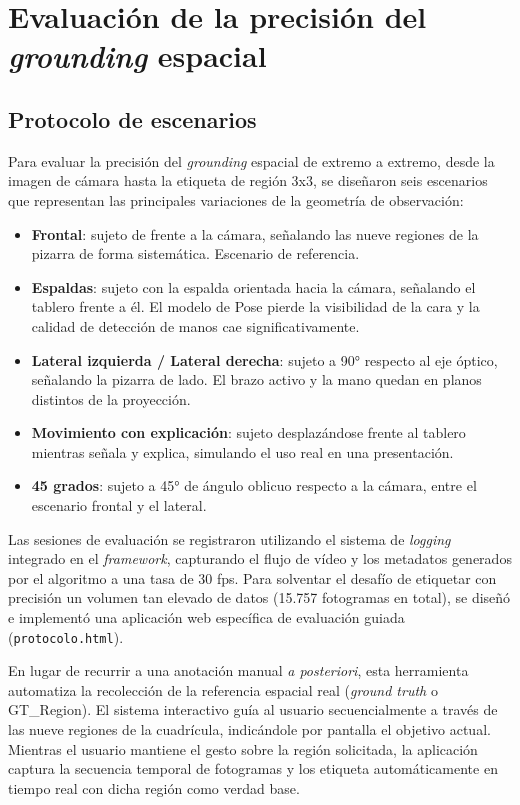 \documentclass[12pt]{report} %
\begin{document}
\section{Evaluación de la precisión del \textit{grounding} espacial}
\label{sec:eval_fingerprint}

\subsection{Protocolo de escenarios}

Para evaluar la precisión del \textit{grounding} espacial de extremo a extremo, desde la imagen de cámara hasta la etiqueta de región 3x3, se diseñaron seis escenarios que representan las principales variaciones de la geometría de observación:

\begin{itemize}
  \item \textbf{Frontal}: sujeto de frente a la cámara, señalando las nueve regiones de la pizarra de forma sistemática. Escenario de referencia.
  \item \textbf{Espaldas}: sujeto con la espalda orientada hacia la cámara, señalando el tablero frente a él. El modelo de Pose pierde la visibilidad de la cara y la calidad de detección de manos cae significativamente.
  \item \textbf{Lateral izquierda / Lateral derecha}: sujeto a 90° respecto al eje óptico, señalando la pizarra de lado. El brazo activo y la mano quedan en planos distintos de la proyección.
  \item \textbf{Movimiento con explicación}: sujeto desplazándose frente al tablero mientras señala y explica, simulando el uso real en una presentación.
  \item \textbf{45 grados}: sujeto a 45° de ángulo oblicuo respecto a la cámara, entre el escenario frontal y el lateral.
\end{itemize}

Las sesiones de evaluación se registraron utilizando el sistema de \textit{logging} integrado en el \textit{framework}, capturando el flujo de vídeo y los metadatos generados por el algoritmo a una tasa de 30 fps. Para solventar el desafío de etiquetar con precisión un volumen tan elevado de datos (15.757 fotogramas en total), se diseñó e implementó una aplicación web específica de evaluación guiada (\texttt{protocolo.html}).

En lugar de recurrir a una anotación manual \textit{a posteriori}, esta herramienta automatiza la recolección de la referencia espacial real (\textit{ground truth} o GT\_Region). El sistema interactivo guía al usuario secuencialmente a través de las nueve regiones de la cuadrícula, indicándole por pantalla el objetivo actual. Mientras el usuario mantiene el gesto sobre la región solicitada, la aplicación captura la secuencia temporal de fotogramas y los etiqueta automáticamente en tiempo real con dicha región como verdad base. 
\end{document}

